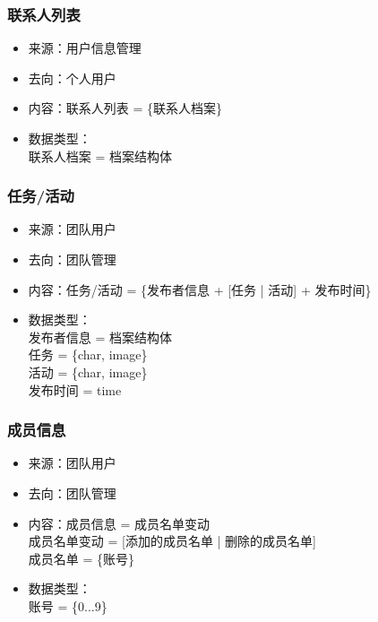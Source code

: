             \subsubsection{联系人列表}
            \begin{itemize}
                \item 来源：用户信息管理
                \item 去向：个人用户
                \item 内容：联系人列表 = \{联系人档案\}
                \item 数据类型：\\
                联系人档案 = 档案结构体\\
            \end{itemize}
            \subsubsection{任务/活动}
            \begin{itemize}
                \item 来源：团队用户
                \item 去向：团队管理
                \item 内容：任务/活动 = \{发布者信息 + [任务 | 活动] + 发布时间\}
                \item 数据类型：\\
                发布者信息 = 档案结构体\\
                任务 = \{char, image\}\\
                活动 = \{char, image\}\\
                发布时间 = time\\
            \end{itemize}
            \subsubsection{成员信息}
            \begin{itemize}
                \item 来源：团队用户
                \item 去向：团队管理
                \item 内容：成员信息 = 成员名单变动\\
                    成员名单变动 = [添加的成员名单 | 删除的成员名单]\\
                    成员名单 = \{账号\}\\
                \item 数据类型：\\
                    账号 = \{0...9\}\\
            \end{itemize}
